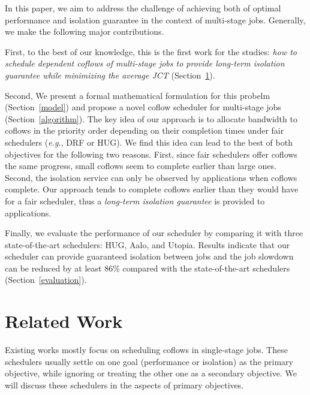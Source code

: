 \documentclass[10pt, conference, letterpaper]{IEEEtran}
\begin{document}
In this paper, we aim to address the challenge of achieving both of optimal performance and isolation guarantee in the context of multi-stage jobs. Generally, we make the following major contributions.

First, to the best of our knowledge, this is the first work for the studies: \emph{how to schedule dependent coflows of multi-stage jobs to provide long-term isolation guarantee while minimizing the average JCT} (Section~\ref{related}).

Second, We present a formal mathematical formulation for this probelm (Section~\ref{model}) and propose a novel coflow scheduler for multi-stage jobs (Section~\ref{algorithm}). The key idea of our approach is to allocate bandwidth to coflows in the priority order depending on their completion times under fair schedulers (\emph{e.g.}, DRF\cite{DRF} or HUG\cite{HUG}). We find this idea can lead to the best of both objectives for the following two reasons. First, since fair schedulers offer coflows the same progress, small coflows seem to complete earlier than large ones. %
Second, the isolation service can only be observed by applications when coflows complete. Our approach tends to complete coflows earlier than they would have for a fair scheduler, thus a \emph{long-term isolation guarantee} is provided to applications. %

Finally, we evaluate the performance of our scheduler by comparing it with three state-of-the-art schedulers: HUG\cite{HUG}, Aalo\cite{aalo}, and Utopia\cite{utopia}. Results indicate that our scheduler can provide guaranteed isolation between jobs and the job slowdown can be reduced by at least 86\% compared with the state-of-the-art schedulers (Section~\ref{evaluation}).

\section{Related Work}\label{related}
Existing works mostly focus on scheduling coflows in single-stage jobs. These schedulers usually settle on one goal (performance or isolation) as the primary objective, while ignoring or treating the other one as a secondary objective. We will discuss these schedulers in the aspects of primary objectives.
\end{document}
